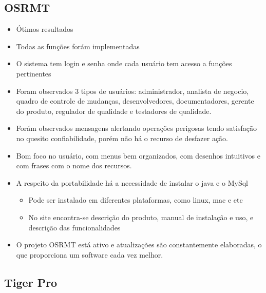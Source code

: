 \subsection{OSRMT}

  \begin{itemize}
    \item Ótimos resultados
    \item Todas as funções forám implementadas
    \item O sistema tem login e senha onde cada usuário tem acesso a funções pertinentes
    \item Foram observados 3 tipos de usuários: administrador, analista de negocio, quadro de controle de mudanças, desenvolvedores,
      documentadores, gerente do produto, regulador de qualidade e testadores de qualidade.
    \item Forám observados mensagens alertando operações perigosas tendo satisfação no quesito confiabilidade, porém não
      há o recurso de desfazer ação.
    \item Bom foco no usuário, com menus bem organizados, com desenhos intuitivos e com frases com o nome dos recursos.
    \item A respeito da portabilidade há a necessidade de instalar o java e o MySql
      \begin{itemize}
        \item Pode ser instalado em diferentes plataformas, como linux, mac e etc
        \item No site encontra-se descrição do produto, manual de instalação e uso, e descrição das funcionalidades
      \end{itemize}
    \item O projeto OSRMT está ativo e atualizações são constantemente elaboradas, o que proporciona um software cada vez melhor.
  \end{itemize}

\subsection{Tiger Pro}

